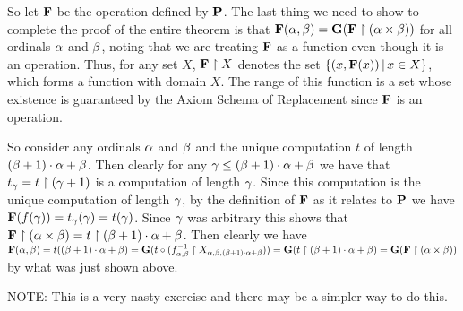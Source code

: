 \begin{solution}
    So let $\F$ be the operation defined by $\P$.
    The last thing we need to show to complete the proof of the entire theorem is that $\F(\a, \b) = \G(\F \rest (\a \times \b))$ for all ordinals $\a$ and $\b$, noting that we are treating $\F$ as a function even though it is an operation.
    Thus, for any set $X$, $\F \rest X$ denotes the set $\braces{(x, \F(x)) \where x \in X}$, which forms a function with domain $X$.
    The range of this function is a set whose existence is guaranteed by the Axiom Schema of Replacement since $\F$ is an operation.

    So consider any ordinals $\a$ and $\b$ and the unique computation $t$ of length $(\b+1)\cdot\a + \b$.
    Then clearly for any $\g \leq (\b+1)\cdot\a + \b$ we have that $t_\g = t \rest (\g+1)$ is a computation of length $\g$.
    Since this computation is the unique computation of length $\g$, by the definition of $\F$ as it relates to $\P$ we have $\F(f(\g)) = t_\g(\g) = t(\g)$.
    Since $\g$ was arbitrary this shows that $\F \rest (\a \times \b) = t \rest (\b+1)\cdot\a + \b$.
    Then clearly we have $\F(\a, \b) = t((\b+1)\cdot\a + \b) = \G(t \circ (\inv{f_{\a,\b}} \rest X_{\a,\b,(\b+1)\cdot\a + \b})) = \G(t \rest (\b+1)\cdot\a + \b) = \G(\F \rest (\a \times \b))$ by what was just shown above. \qedsymbol

    NOTE: This is a very nasty exercise and there may be a simpler way to do this.
\end{solution}


